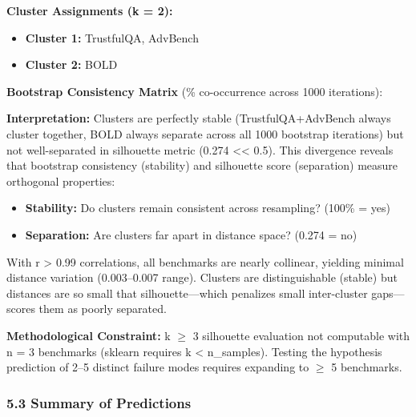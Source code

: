 \textbf{Cluster Assignments (k = 2):}
\begin{itemize}
\item \textbf{Cluster 1:} TrustfulQA, AdvBench
\item \textbf{Cluster 2:} BOLD
\end{itemize}

\textbf{Bootstrap Consistency Matrix} (\% co-occurrence across 1000 iterations):

\begin{table}[htbp]
\centering
{}
\end{table}

\textbf{Interpretation:} Clusters are perfectly stable (TrustfulQA+AdvBench always cluster together, BOLD always separate across all 1000 bootstrap iterations) but not well-separated in silhouette metric (0.274 << 0.5). This divergence reveals that bootstrap consistency (stability) and silhouette score (separation) measure orthogonal properties:
\begin{itemize}
\item \textbf{Stability:} Do clusters remain consistent across resampling? (100\% = yes)
\item \textbf{Separation:} Are clusters far apart in distance space? (0.274 = no)
\end{itemize}

With r > 0.99 correlations, all benchmarks are nearly collinear, yielding minimal distance variation (0.003--0.007 range). Clusters are distinguishable (stable) but distances are so small that silhouette---which penalizes small inter-cluster gaps---scores them as poorly separated.

\textbf{Methodological Constraint:} k $\geq$ 3 silhouette evaluation not computable with n = 3 benchmarks (sklearn requires k < n\_samples). Testing the hypothesis prediction of 2--5 distinct failure modes requires expanding to $\geq$ 5 benchmarks.

\subsubsection{5.3 Summary of Predictions}

